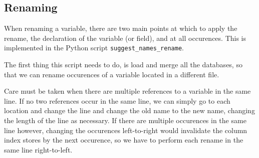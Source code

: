\subsection{Renaming}

When renaming a variable, there are two main points at which to apply the
rename, the declaration of the variable (or field), and at all occurences.
This is implemented in the Python script \lstinline|suggest_names_rename|.

The first thing this script needs to do, is load and merge all the databases,
so that we can rename occurences of a variable located in a different file.

Care must be taken when there are multiple references to a variable in the same
line. If no two references occur in the same line, we can simply go to each
location and change the line and change the old name to the new name, changing
the length of the line as necessary. If there are multiple occurences in the
same line however, changing the occurences left-to-right would invalidate the
column index stores by the next occurence, so we have to perform each rename in
the same line right-to-left.

